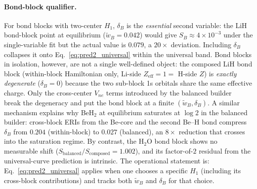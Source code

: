 \documentclass[twocolumn,pra,amsmath,amssymb,superscriptaddress]{revtex4-2}
\begin{document}
\paragraph*{Bond-block qualifier.}  For bond blocks with
two-center $H_1$, $\delta_B$ is the \emph{essential} second
variable: the LiH bond-block point at equilibrium
($\tilde{w}_B = 0.042$) would give $S_B \approx 4\times 10^{-3}$
under the single-variable fit but the actual value is $0.079$,
a $20\times$ deviation.  Including $\delta_B$ collapses it onto
Eq.~\eqref{eq:pred2_universal} within the universal band.
Bond blocks in isolation, however, are not a single
well-defined object: the composed LiH bond block (within-block
Hamiltonian only, Li-side $Z_{\mathrm{eff}}=1 = $ H-side $Z$)
is \emph{exactly degenerate} ($\delta_B=0$) because the two
sub-block 1s orbitals share the same effective charge.  Only
the cross-center $V_{ne}$ terms introduced by the balanced
builder~\cite{GeoVac_Paper19} break the degeneracy and put the
bond block at a finite $(\tilde{w}_B,\delta_B)$.  A similar
mechanism explains why BeH$_2$ at equilibrium saturates at
$\log 2$ in the balanced builder: cross-block ERIs from the
Be-core and the second Be--H bond compress $\delta_B$ from
$0.204$ (within-block) to $0.027$ (balanced), an $8\times$
reduction that crosses into the saturation regime.  By
contrast, the H$_2$O bond block shows no measurable shift
($S_{\mathrm{balanced}}/S_{\mathrm{composed}} = 1.002$), and its
factor-of-$2$ residual from the universal-curve prediction is
intrinsic.  The operational statement is:
Eq.~\eqref{eq:pred2_universal} applies when one chooses a
specific $H_1$ (including its cross-block contributions) and
tracks both $\tilde{w}_B$ and $\delta_B$ for that choice.
\end{document}
